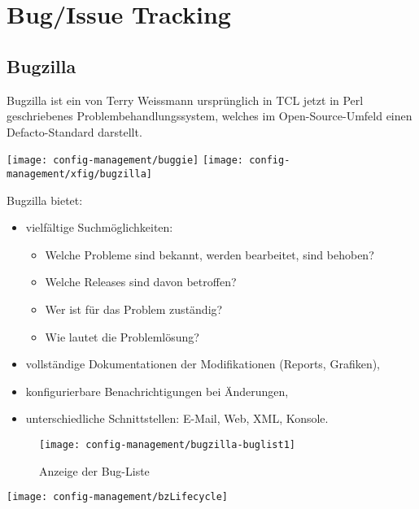 
\chapter{Bug/Issue Tracking}
\section{Bugzilla}
Bugzilla ist ein von Terry Weissmann ursprünglich in TCL jetzt in Perl
geschriebenes
Problembehandlungssystem, welches im Open-Source-Umfeld einen
Defacto-Standard darstellt.
\begin{center}
\texttt{[image: config-management/buggie]}\hfill
\texttt{[image: config-management/xfig/bugzilla]}
\end{center}
Bugzilla bietet:

\begin{minipage}{0.48\linewidth}
\begin{itemize}
\item vielfältige Suchmöglichkeiten:
  \begin{itemize}
  \item Welche Probleme sind bekannt, werden bearbeitet, sind behoben?
  \item Welche Releases sind davon betroffen?
  \item Wer ist für das Problem zuständig?
  \item Wie lautet die Problemlösung?
  \end{itemize}
\end{itemize}
\end{minipage}\hfill
\begin{minipage}{0.48\linewidth}
\begin{itemize}
\item vollständige Dokumentationen der Modifikationen (Reports, Grafiken),
\item konfigurierbare Benachrichtigungen bei \"Anderungen,
\item unterschiedliche Schnittstellen: E-Mail, Web, XML, Konsole.
\end{itemize}
\end{minipage}
\begin{figure}[H]
\centering
\texttt{[image: config-management/bugzilla-buglist1]}
\caption{Anzeige der Bug-Liste}
\end{figure}
\newpage
\ifslides
\begin{center}
\texttt{[image: config-management/bzLifecycle]}
\end{center}
\else
